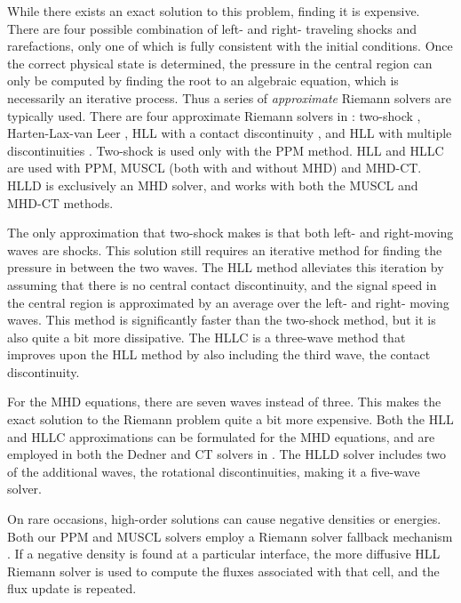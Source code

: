 While there exists an exact solution to this problem, finding it is
expensive.  There are four possible combination of left- and right-
traveling shocks and rarefactions, only one of which is fully
consistent with the initial conditions.  Once the correct physical
state is determined, the pressure in the central region can only be
computed by finding the root to an algebraic equation, which is
necessarily an iterative process.  Thus a series of \emph{approximate}
Riemann solvers are typically used.  There are four approximate
Riemann solvers in \enzo: two-shock \citep{toro-1997}, Harten-Lax-van
Leer \citep[HLL,][]{toro-1997}, HLL with a contact discontinuity
\citep[HLLC,][]{toro-1997}, and HLL with multiple discontinuities
\citep[HLLD,][]{Miyoshi05}.  Two-shock is used only with the PPM
method.  HLL and HLLC are used with PPM, MUSCL (both with and without
MHD) and MHD-CT.  HLLD is exclusively an MHD solver, and works with
both the MUSCL and MHD-CT methods.

The only approximation that two-shock makes is that both left- and
right-moving waves are shocks.  This solution still requires an
iterative method for finding the pressure in between the two waves.
The HLL method alleviates this iteration by assuming that there is no
central contact discontinuity, and the signal speed in the central
region is approximated by an average over the left- and right- moving
waves.  This method is significantly faster than the two-shock method,
but it is also quite a bit more dissipative.  The HLLC is a three-wave
method that improves upon the HLL method by also including the third
wave, the contact discontinuity.

For the MHD equations, there are seven waves instead of three.  This
makes the exact solution to the Riemann problem quite a bit more
expensive.  Both the HLL and HLLC approximations can be formulated for
the MHD equations, and are employed in both the Dedner and CT solvers
in \enzo.  The HLLD solver includes two of the additional waves, the
rotational discontinuities, making it a five-wave solver.

On rare occasions, high-order solutions can cause negative densities
or energies.  Both our PPM and MUSCL solvers employ a Riemann solver
fallback mechanism \citep{Lemaster09}.  If a negative density is found
at a particular interface, the more diffusive HLL Riemann solver is
used to compute the fluxes associated with that cell, and the flux
update is repeated.



